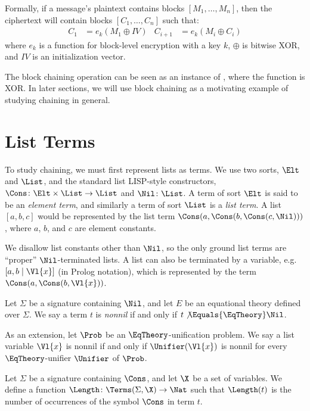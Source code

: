 Formally, if a message's plaintext contains blocks $[M_1, \dotsc, M_n]$, then
the ciphertext will contain blocks $[C_1, \dotsc, C_n]$ such that:
\begin{align*}
    C_1 &= e_k(M_1 \oplus IV) &
    C_{i+1} &= e_k(M_i \oplus C_i)
\end{align*}
where $e_k$ is a function for block-level encryption with a key $k$, $\oplus$
is bitwise XOR, and $IV$ is an initialization vector.

The block chaining operation can be seen as an instance of , where
the function is XOR\@. In later sections, we will use block chaining as a
motivating example of studying chaining in general.



\section{List Terms}
To study chaining, we must first represent lists as terms. We use two sorts,
$\Elt$ and $\List$, and the standard list LISP-style constructors, $\Cons\colon
\Elt \times \List \to \List$ and $\Nil\colon \List$. A term of sort $\Elt$ is
said to be an \emph{element term}, and similarly a term of sort $\List$ is a
\emph{list term}. A list $[a, b, c]$ would be represented by the list term
$\Cons(a, \Cons(b, \Cons(c, \Nil)))$, where $a$, $b$, and $c$ are element
constants.

We disallow list constants other than $\Nil$, so the only ground list terms are
``proper'' $\Nil$-terminated lists. A list can also be terminated by a
variable, e.g. $[a, b \mid \Vl{x}]$ (in Prolog notation), which is represented
by the term $\Cons(a, \Cons(b, \Vl{x}))$.

\begin{Definition}
    Let $\Sigma$ be a signature containing $\Nil$, and let $E$ be an equational
    theory defined over $\Sigma$. We say a term $t$ is \emph{nonnil} if and
    only if $t \not\Equals{\EqTheory} \Nil$.

    As an extension, let $\Prob$ be an $\EqTheory$-unification problem. We say
    a list variable $\Vl{x}$ is nonnil if and only if $\Unifier(\Vl{x})$ is
    nonnil for every $\EqTheory$-unifier $\Unifier$ of $\Prob$.
\end{Definition}

\begin{Definition}
    Let $\Sigma$ be a signature containing $\Cons$, and let $\X$ be a set of
    variables. We define a function $\Length \colon \Terms(\Sigma, \X) \to
    \Nat$ such that $\Length(t)$ is the number of occurrences of the symbol
    $\Cons$ in term $t$.
\end{Definition}

